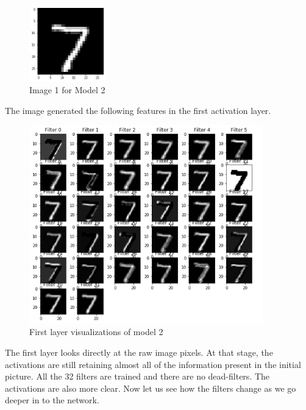 \begin{figure}[h!]
    \centering
    \includegraphics[width=0.3\textwidth]{thesis_template/images/7.png}
    \caption{\small Image 1 for Model 2}
    \label{}
    \end{figure}
 \noindent The image generated the following features in the first activation layer.   
    \begin{figure}[h!]
    \centering
    \includegraphics[width=0.9\textwidth]{thesis_template/images/71vis.png}
    \caption{\small First layer visualizations of model 2}
    \label{}
    \end{figure}

\newpage \noindent The first layer looks directly at the raw image pixels. At that stage, the activations are still retaining almost all of the information present in the initial picture. All the 32 filters are trained and there are no dead-filters. The activations are also more clear. Now let us see how the filters change as we go deeper in to the network.

